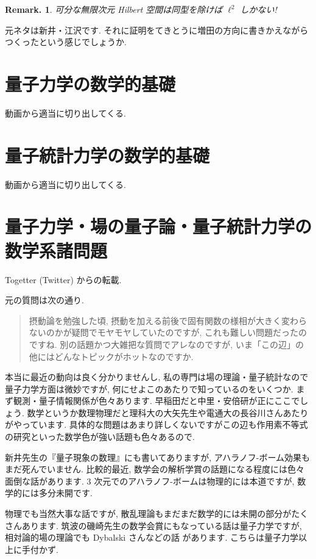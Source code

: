 \documentclass[openany, a4paper, oneside]{jsbook}
\theoremstyle{break}
\theoremstyle{breakdefn}
\newtheorem{rem}[thm]{Remark.}
\begin{document}
\begin{rem}
 可分な無限次元 Hilbert 空間は同型を除けば $\ell^2$ しかない!
\end{rem}

元ネタは新井・江沢\cite{AraiEzawa1, AraiEzawa2}です.
それに証明をてきとうに増田\cite{HisayaMasuda1}の方向に書きかえながらつくったという感じでしょうか.
\chapter{量子力学の数学的基礎}


動画から適当に切り出してくる.
\chapter{量子統計力学の数学的基礎}


動画から適当に切り出してくる.
\chapter{量子力学・場の量子論・量子統計力学の数学系諸問題}


Togetter (Twitter) からの転載.

元の質問は次の通り.
\begin{quote}
摂動論を勉強した頃, 摂動を加える前後で固有関数の様相が大きく変わらないのかが疑問でモヤモヤしていたのですが,
これも難しい問題だったのですね.
別の話題かつ大雑把な質問でアレなのですが, いま「この辺」の他にはどんなトピックがホットなのですか.
\end{quote}

本当に最近の動向は良く分かりませんし,
私の専門は場の理論・量子統計なので量子力学方面は微妙ですが, 何にせよこのあたりで知っているのをいくつか.
まず観測・量子情報関係が色々あります.
早稲田だと中里・安倍研が正にここでしょう.
数学というか数理物理だと理科大の大矢先生や電通大の長谷川さんあたりがやっています.
具体的な問題はあまり詳しくないですがこの辺も作用素不等式の研究といった数学色が強い話題も色々あるので.

新井先生の『量子現象の数理』\cite{AsaoArai4}にも書いてありますが,
アハラノフ-ボーム効果もまだ死んでいません.
比較的最近, 数学会の解析学賞の話題になる程度には色々面倒な話があります.
3 次元でのアハラノフ-ボームは物理的には本道ですが, 数学的には多分未開です.

物理でも当然大事な話ですが, 散乱理論もまだまだ数学的には未開の部分がたくさんあります.
筑波の磯崎先生の数学会賞にもなっている話は量子力学ですが,
相対論的場の理論でも Dybalski さんなどの話 \cite{WojciechDybalski1} があります.
こちらは量子力学以上に手付かず.
\end{document}

